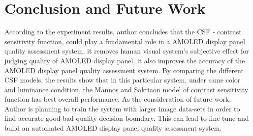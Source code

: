 \documentclass{article}
\begin{document}
\section{Conclusion and Future Work}
According to the experiment results, author concludes that the CSF - contrast sensitivity function, could play a fundamental role in a AMOLED display panel quality assessment system, it removes human visual system's subjective effect for judging quality of AMOLED display panel, it also improves the accuracy of the AMOLED display panel quality assessment system. By comparing the different CSF models, the results show that in this particular system, under same color and luminance condition, the Mannos and Sakriaon model of contrast sensitivity function has best overall performance. As the consideration of future work, Author is planning to train the system with larger image data-sets in order to find accurate good-bad quality decision boundary. This can lead to fine tune and build an automated AMOLED display panel quality assessment system.    
\end{document}
